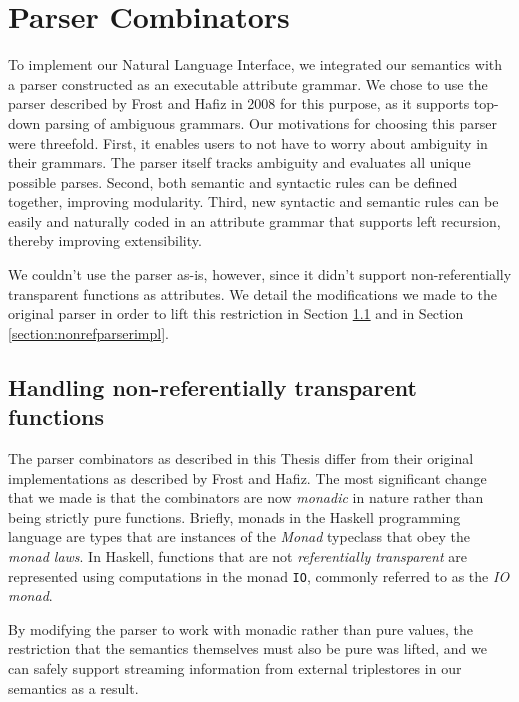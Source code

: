 \documentclass[../main.tex]{subfiles}
\begin{document}
\chapter{Parser Combinators}
\label{chapter:combinators}

To implement our Natural Language Interface, we integrated our semantics with a parser constructed as an executable attribute grammar.  We chose to use the parser
described by Frost and Hafiz in 2008\cite{frosthafiz2008} for this purpose, as it supports top-down parsing of ambiguous grammars.  Our motivations
for choosing this parser were threefold.  First, it enables users to not have to worry about ambiguity in their grammars.  The parser itself
tracks ambiguity and evaluates all unique possible parses\cite{frosthafiz2008}.  Second, both semantic and syntactic rules can be defined together, improving modularity\cite{frosthafiz2008}.
Third, new syntactic and semantic rules can be easily and naturally coded in an attribute grammar that supports left recursion, thereby improving
extensibility\cite{frosthafiz2008}.

We couldn't use the parser
as-is, however, since it didn't support non-referentially transparent functions as attributes.  We detail the modifications we made to the original parser in order to lift this restriction in Section \ref{section:nonrefparser} and in Section \ref{section:nonrefparserimpl}.

\section{Handling non-referentially transparent functions}
\label{section:nonrefparser}

The parser combinators as described in this Thesis differ from their original implementations
as described by Frost and Hafiz\cite{frosthafiz2008}.  The most significant change that we made is that the combinators are now {\em monadic} in nature rather than being strictly pure functions.
Briefly, monads in the Haskell programming language are types that are instances of the {\em Monad} typeclass that obey the
{\em monad laws}\cite{monadlaws}.  In Haskell, functions that are not {\em referentially transparent} are represented using computations in the monad \texttt{IO}, commonly referred to as the {\em IO monad}.

By modifying the parser to work with monadic rather than pure values, the restriction that the semantics themselves must also be pure was lifted, and
we can safely support streaming information from external triplestores in our semantics as a result.
\end{document}
